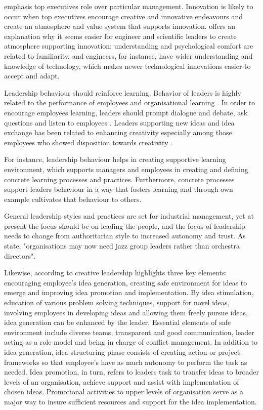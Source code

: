 \citet{quinn1985managing} emphasis top executives role over particular management. Innovation is likely to occur when top executives encourage creative and innovative endeavours and create an atmosphere and value system that supports innovation. \citet{quinn1985managing} offers an explanation why it seems easier for engineer and scientific leaders to create atmosphere supporting innovation: understanding and psychological comfort are related to familiarity, and engineers, for instance, have wider understanding and knowledge of technology, which makes newer technological innovations easier to accept and adapt. 
 
Leadership behaviour should reinforce learning. Behavior of leaders is highly related to the performance of employees \citep{kim2014blue} and organisational learning \citep{garvin2008yours}. In order to encourage employees learning, leaders should prompt dialogue and debate, ask questions and listen to employees \citep{kim2014blue,garvin2008yours}. Leaders supporting new ideas and idea exchange has been related to enhancing creativity especially among those employees who showed disposition towards creativity \citep{oldham1996employee}.  

For instance, leadership behaviour helps in creating supportive learning environment, which supports managers and employees in creating and defining concrete learning processes and practices. Furthermore, concrete processes support leaders behaviour in a way that fosters learning and through own example cultivates that behaviour to others. \citep{garvin2008yours}

General leadership styles and practices are set for industrial management, yet at present the focus should be on leading the people, and the focus of leadership needs to change from authoritarian style to increased autonomy and trust. As \citet{mumford2002leading} state, "organisations may now need jazz group leaders rather than orchestra directors". 

Likewise, according to \citet{mumford2002leading} creative leadership highlights three key elements: encouraging employee's idea generation, creating safe environment for ideas to emerge and improving idea promotion and implementation. By idea stimulation, education of various problem solving techniques, support for novel ideas, involving employees in developing ideas and allowing them freely pursue ideas, idea generation can be enhanced by the leader. Essential elements of safe environment include diverse teams, transparent and good communication, leader acting as a role model and being in charge of conflict management. In addition to idea generation, idea structuring phase consists of creating action or project frameworks so that employee's have as much autonomy to perform the task as needed. Idea promotion, in turn, refers to leaders task to transfer ideas to broader levels of an organisation, achieve support and assist with implementation of chosen ideas. Promotional activities to upper levels of organisation serve as a major way to insure sufficient resources and support for the idea implementation. \citep{mumford2002leading} 

